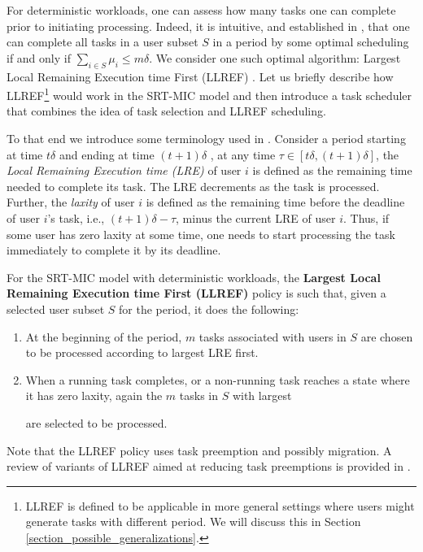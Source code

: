 \documentclass[prodmode,acmtompecs]{acmsmall}
\newcommand{\myComments}[1]{}
\newif\ifinfocom
\newif\iftompecs
\newcommand{\infocomStart}{\ifinfocom \myComments{Infocom: }}
\newcommand{\tompecsStart}{\iftompecs \myComments{TOMPECS version: }}
\newcommand{\commentEnd}{\myComments{End}}
\begin{document}
For deterministic workloads, one can assess how many tasks one can complete prior to initiating processing. 
Indeed, it is intuitive, and established in \cite{CRJ06}, that one can complete all tasks in a user subset $S$ in a period by some optimal scheduling if and only if $\sum\limits_{i \in S} \mu_i \leq m\delta$. We consider one such optimal algorithm: Largest Local Remaining Execution time First (LLREF) \cite{CRJ06}. Let us briefly describe how LLREF\footnote{LLREF is defined to be applicable in more general settings where users might generate tasks with different period. We will discuss this in Section \ref{section_possible_generalizations}. } would work in the SRT-MIC model and then introduce a task scheduler that combines the idea of task selection and LLREF scheduling. 

To that end we introduce some terminology used in \cite{CRJ06}. Consider a period starting at time $t\delta$ and ending at time $(t+1)\delta$ , at any time $\tau \in [t\delta, (t+1)\delta]$, the {\em Local Remaining Execution time (LRE)} of user $i$ is defined as the remaining time needed to complete its task. The LRE decrements as the task is processed. 
Further, the {\em laxity} of user $i$ is defined as the remaining time before the deadline of user $i$'s task, i.e., $(t+1)\delta - \tau$, minus the current LRE of user $i$. Thus, if some user has zero laxity at some time, one needs to start processing the task immediately to complete it by its deadline. 

\begin{definition}
\label{defn_LLREF}
For the SRT-MIC model with deterministic workloads, the {\bf Largest Local Remaining Execution time First (LLREF)} policy is such that, given a selected user subset $S$ for the period, it does the following: 
\begin{enumerate}
\item At the beginning of the period, $m$ tasks associated with users in $S$ are chosen to be processed according to largest LRE first.
\item When a running task completes, or a non-running task reaches a state where it has zero laxity, again the $m$ tasks in $S$ with largest 
\infocomStart
LRE
\commentEnd\fi
\tompecsStart
local remaining execution time
\commentEnd\fi
are selected to be processed. 
\end{enumerate}
\end{definition}
Note that the LLREF policy uses task preemption and possibly migration. A review of variants of LLREF aimed at reducing task preemptions is provided in \cite{DaB11A}. 
\end{document}
